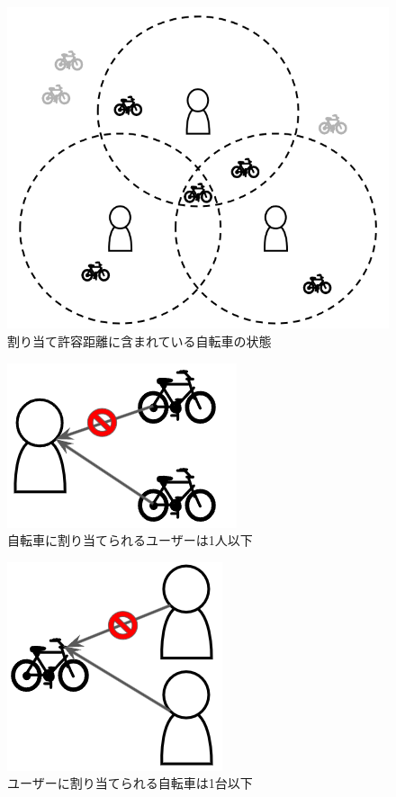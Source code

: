       \begin{figure}[htbp]
        \centering
        \includegraphics[scale=0.45]
        {figures/objectFunction1.png}
        \caption{割り当て許容距離に含まれている自転車の状態}
        \label{fig:割り当て許容距離に含まれている自転車の状態}
      \end{figure}
      
      \begin{figure}[htbp]
        \centering
        \includegraphics[scale=1.18]
        {figures/objectFunction2.png}
        \caption{自転車に割り当てられるユーザーは1人以下}
        \label{fig:自転車に割り当てられるユーザーは1人以下}
      \end{figure}
      
      \begin{figure}[htbp]
        \centering
        \includegraphics[scale=1.2]
        {figures/objectFunction3.png}
        \caption{ユーザーに割り当てられる自転車は1台以下}
        \label{fig:ユーザーに割り当てられる自転車は1台以下}
      \end{figure}


